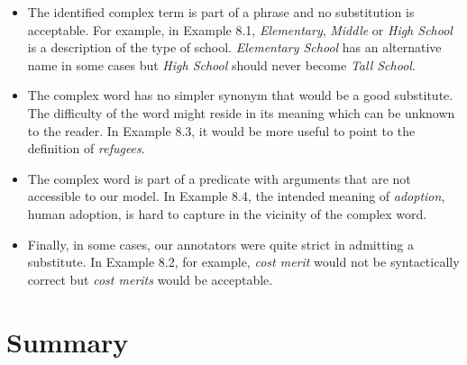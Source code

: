 \documentclass[thesis.tex]{subfiles}
\begin{document}
\begin{itemize}
\item The identified complex term is part of a phrase and no substitution is acceptable. For example, in Example 8.1, \textit{Elementary}, \textit{Middle} or \textit{High School} is a description of the type of school. \emph{Elementary School} has an alternative name in some cases but \emph{High School} should never become \emph{Tall School}.
\item The complex word has no simpler synonym that would be a good substitute. The difficulty of the word might reside in its meaning which can be unknown to the reader. In Example 8.3, it would be more useful to point to the definition of \emph{refugees}. 
\item The complex word is part of a predicate with arguments that are not accessible to our model. In Example 8.4, the intended meaning of \emph{adoption}, human adoption, is hard to capture in the vicinity of the complex word. 
\item Finally, in some cases, our annotators were quite strict in admitting a substitute. In Example 8.2, for example, \emph{cost merit} would not be syntactically correct but \emph{cost merits} would be acceptable. 
\end{itemize}


\section{Summary}


\biblio
\end{document}
